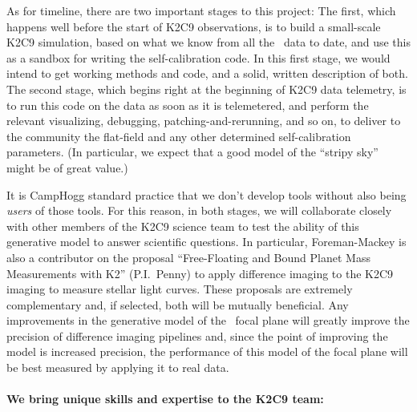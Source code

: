 \documentclass[12pt,preprint]{aastex}
\begin{document}
As for timeline, there are two important stages to this project:
The first, which happens well before the start of K2C9 observations,
is to build a small-scale K2C9 simulation, based on what we know from
all the \ktwo\ data to date, and use this as a sandbox for writing the
self-calibration code.
In this first stage, we would intend to get working methods and code,
and a solid, written description of both.
The second stage, which begins right at the beginning of K2C9 data
telemetry, is to run this code on the data as soon as it is
telemetered, and perform the relevant visualizing, debugging,
patching-and-rerunning, and so on, to deliver to the community the
flat-field and any other determined self-calibration parameters.
(In particular, we expect that a good model of the ``stripy sky''
might be of great value.)

It is CampHogg standard practice that we don't develop tools without
also being \emph{users} of those tools.
For this reason, in both stages, we will collaborate closely with other
members of the K2C9 science team to test the ability of this generative model
to answer scientific questions.
In particular, Foreman-Mackey is also a contributor on the proposal
``Free-Floating and Bound Planet Mass Measurements with K2'' (P.I.~Penny) to
apply difference imaging to the K2C9 imaging to measure stellar light curves.
These proposals are extremely complementary and, if selected, both will be
mutually beneficial.
Any improvements in the generative model of the \ktwo\ focal plane will
greatly improve the precision of difference imaging pipelines and, since the
point of improving the model is increased precision, the performance of this
model of the focal plane will be best measured by applying it to real data.


\paragraph{We bring unique skills and expertise to the K2C9 team:}
\end{document}
